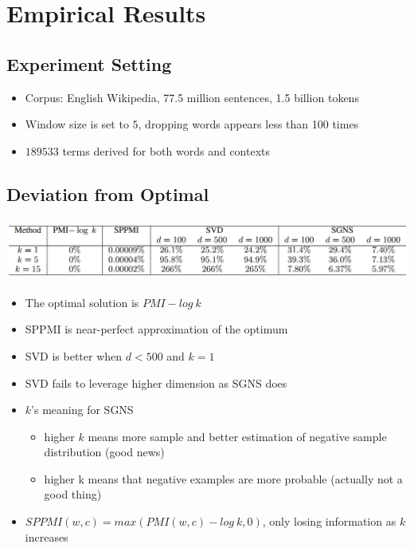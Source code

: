 \documentclass[compress]{beamer}
\begin{document}
\section{Empirical Results}
\subsection{Experiment Setting}
\begin{frame}{\subsecname}
	\begin{itemize}
      \item Corpus: English Wikipedia, 77.5 million sentences, 1.5 billion tokens
      \item Window size is set to $5$, dropping words appears less than 100 times
      \item $189533$ terms derived for both words and contexts
    \end{itemize}
\end{frame}
\subsection{Deviation from Optimal}
\begin{frame}{\subsecname}
	\includegraphics[height=2cm,width=\textwidth]{deviation.png}
	\begin{itemize}
    	\item The optimal solution is $PMI-log~k$
		\item SPPMI is near-perfect approximation of the optimum
		\item SVD is better when $d<500$ and $k=1$
        \item SVD fails to leverage higher dimension as SGNS does
        \item $k$'s meaning for SGNS
        \begin{itemize}
	        \item higher $k$ means more sample and better estimation of negative sample distribution (good news)
            \item higher k means that negative examples are more probable (actually not a good thing)
        \end{itemize}
		\item $SPPMI(w,c)=max(PMI(w,c)-log~k,0)$, only losing information as $k$ increases
	\end{itemize}
\end{frame}
\end{document}
